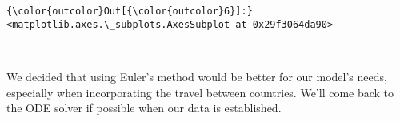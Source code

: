 \documentclass[11pt]{article}
\begin{document}
\begin{Verbatim}[commandchars=\\\{\}]
{\color{outcolor}Out[{\color{outcolor}6}]:} <matplotlib.axes.\_subplots.AxesSubplot at 0x29f3064da90>
\end{Verbatim}
            
    \begin{center}
    \end{center}
    { \hspace*{\fill} \\}
    
    We decided that using Euler's method would be better for our model's
needs, especially when incorporating the travel between countries. We'll
come back to the ODE solver if possible when our data is established.
\end{document}
